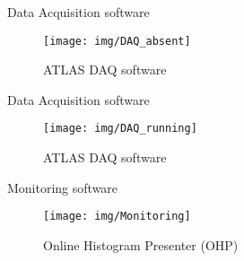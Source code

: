 \documentclass[9pt]{beamer}
\begin{document}
\begin{frame}{Data Acquisition software}
\vspace*{-1cm}
\begin{figure}\texttt{[image: img/DAQ\_absent]}\vspace*{-0.2cm}\caption{ATLAS DAQ software}\end{figure}\vspace*{-1cm}
\end{frame}

\begin{frame}{Data Acquisition software}
\vspace*{-1cm}
\begin{figure}\texttt{[image: img/DAQ\_running]}\vspace*{-0.2cm}\caption{ATLAS DAQ software}\end{figure}\vspace*{-1cm}
\end{frame}

\begin{frame}{Monitoring software}
\vspace*{-0.5cm}
\begin{figure}\texttt{[image: img/Monitoring]}\vspace*{-0.2cm}\caption{Online Histogram Presenter (OHP)}\end{figure}\vspace*{-1cm}
\end{frame}
\end{document}
